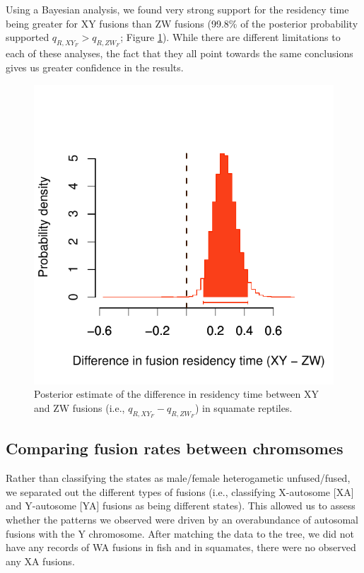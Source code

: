 \documentclass[12pt,twoside]{article}
\begin{document}
Using a Bayesian analysis, we found very strong support for the residency time being greater for XY fusions than ZW fusions (99.8\% of the posterior probability supported $q_{R,XY_F} > q_{R,ZW_F}$; Figure \ref{fig:squa-resid}). While there are different limitations to each of these analyses, the fact that they all point towards the same conclusions gives us greater confidence in the results.

\begin{figure}[p]
\centering
\includegraphics[scale=1.1]{figs/karyotype-residency-squa-6par}
\caption{Posterior estimate of the difference in residency time between XY and ZW fusions (i.e., $q_{R,XY_F} - q_{R,ZW_F}$) in squamate reptiles.}
\label{fig:squa-resid}
\end{figure}


\subsection{Comparing fusion rates between chromsomes} 

Rather than classifying the states as male/female heterogametic unfused/fused, we separated out the different types of fusions (i.e., classifying X-autosome [XA] and Y-autosome [YA] fusions as being different states). This allowed us to assess whether the patterns we observed were driven by an overabundance of autosomal fusions with the Y chromosome. After matching the data to the tree, we did not have any records of WA fusions in fish and in squamates, there were no observed any XA fusions.
\end{document}
